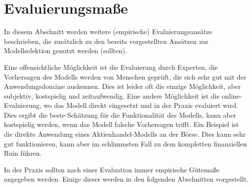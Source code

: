 	\section{Evaluierungsmaße}
		In diesem Abschnitt werden weitere (empirische) Evaluierungsansätze beschrieben, die zusätzlich zu den bereits vorgestellten Ansätzen zur Modellselektion genutzt werden (sollten).

		Eine offensichtliche Möglichkeit ist die Evaluierung durch Experten, \dh die Vorhersagen des Modells werden von Menschen geprüft, die sich sehr gut mit der Anwendungsdomäne auskennen. Dies ist leider oft die einzige Möglichkeit, aber subjektiv, kostspielig und zeitaufwendig. Eine andere Möglichkeit ist die online-Evaluierung, wo das Modell direkt eingesetzt und in der Praxis evaluiert wird. Dies ergibt die beste Schätzung für die Funktionalität des Modells, kann aber kostspielig werden, wenn das Modell falsche Vorhersagen trifft. Ein Beispiel ist die direkte Anwendung eines Aktienhandel-Modells an der Börse. Dies kann sehr gut funktionieren, kann aber im schlimmsten Fall zu dem kompletten finanziellen Ruin führen.

		In der Praxis sollten nach einer Evaluation immer empirische Gütemaße angegeben werden. Einige dieser werden in den folgenden Abschnitten vorgestellt.

